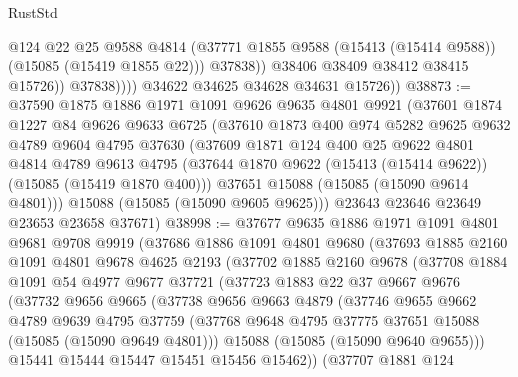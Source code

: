 \begin{lexlean}{RustStd}
\begin{coremodule}
                        @124
                        @22
                        @25
                        @9588
                        @4814
                        (@37771 @1855 @9588 (@15413 (@15414 @9588)) (@15085 (@15419 @1855 @22)))
                        @37838))
                    @38406
                    @38409
                    @38412
                    @38415
                    @15726))
                @37838))))
        @34622
        @34625
        @34628
        @34631
        @15726))
@38873 := @37590
    @1875
    @1886
    @1971
    @1091
    @9626
    @9635
    @4801
    @9921
    (@37601
      @1874
      @1227
      @84
      @9626
      @9633
      @6725
      (@37610
        @1873
        @400
        @974
        @5282
        @9625
        @9632
        @4789
        @9604
        @4795
        @37630
        (@37609
          @1871
          @124
          @400
          @25
          @9622
          @4801
          @4814
          @4789
          @9613
          @4795
          (@37644 @1870 @9622 (@15413 (@15414 @9622)) (@15085 (@15419 @1870 @400)))
          @37651
          @15088
          (@15085 (@15090 @9614 @4801)))
        @15088
        (@15085 (@15090 @9605 @9625)))
      @23643
      @23646
      @23649
      @23653
      @23658
      @37671)
@38998 := @37677
    @9635
    @1886
    @1971
    @1091
    @4801
    @9681
    @9708
    @9919
    (@37686
      @1886
      @1091
      @4801
      @9680
      (@37693
        @1885
        @2160
        @1091
        @4801
        @9678
        @4625
        @2193
        (@37702
          @1885
          @2160
          @9678
          (@37708
            @1884
            @1091
            @54
            @4977
            @9677
            @37721
            (@37723
              @1883
              @22
              @37
              @9667
              @9676
              (@37732
                @9656
                @9665
                (@37738
                  @9656
                  @9663
                  @4879
                  (@37746
                    @9655
                    @9662
                    @4789
                    @9639
                    @4795
                    @37759
                    (@37768 @9648 @4795 @37775 @37651 @15088 (@15085 (@15090 @9649 @4801)))
                    @15088
                    (@15085 (@15090 @9640 @9655)))
                  @15441
                  @15444
                  @15447
                  @15451
                  @15456
                  @15462))
              (@37707
                @1881
                @124

\end{coremodule}
\end{lexlean}

